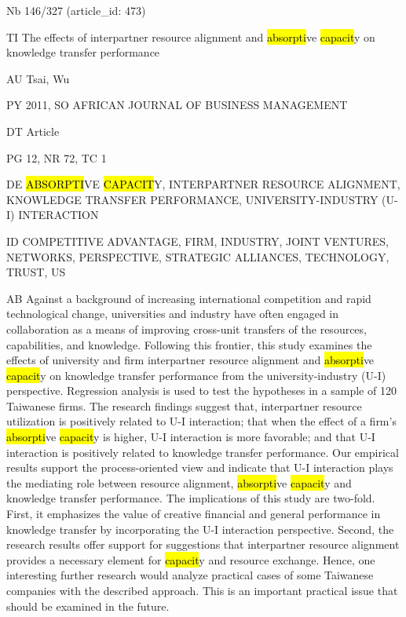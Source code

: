 \documentclass[a4paper]{article}
\begin{document}
\vspace*{-2cm}
Nb \tabto{0cm}146/327 (article\_id: 473)\par
TI \tabto{0cm}The effects of interpartner resource alignment and \hl{absorpti}ve \hl{capacit}y on knowledge transfer performance\par
AU \tabto{0cm}Tsai, Wu\par
PY \tabto{0cm}2011, SO AFRICAN JOURNAL OF BUSINESS MANAGEMENT\par
DT \tabto{0cm}Article\par
PG \tabto{0cm}12, NR 72, TC 1\par
DE \tabto{0cm}\hl{ABSORPTI}VE \hl{CAPACIT}Y, INTERPARTNER RESOURCE ALIGNMENT, KNOWLEDGE TRANSFER PERFORMANCE, UNIVERSITY-INDUSTRY (U-I) INTERACTION\par
ID \tabto{0cm}COMPETITIVE ADVANTAGE, FIRM, INDUSTRY, JOINT VENTURES, NETWORKS, PERSPECTIVE, STRATEGIC ALLIANCES, TECHNOLOGY, TRUST, US\par
AB \tabto{0cm}Against a background of increasing international competition and rapid technological change, universities and industry have often engaged in collaboration as a means of improving cross-unit transfers of the resources, capabilities, and knowledge. Following this frontier, this study examines the effects of university and firm interpartner resource alignment and \hl{absorpti}ve \hl{capacit}y on knowledge transfer performance from the university-industry (U-I) perspective. Regression analysis is used to test the hypotheses in a sample of 120 Taiwanese firms. The research findings suggest that, interpartner resource utilization is positively related to U-I interaction; that when the effect of a firm's \hl{absorpti}ve \hl{capacit}y is higher, U-I interaction is more favorable; and that U-I interaction is positively related to knowledge transfer performance. Our empirical results support the process-oriented view and indicate that U-I interaction plays the mediating role between resource alignment, \hl{absorpti}ve \hl{capacit}y and knowledge transfer performance. The implications of this study are two-fold. First, it emphasizes the value of creative financial and general performance in knowledge transfer by incorporating the U-I interaction perspective. Second, the research results offer support for suggestions that interpartner resource alignment provides a necessary element for \hl{capacit}y and resource exchange. Hence, one interesting further research would analyze practical cases of some Taiwanese companies with the described approach. This is an important practical issue that should be examined in the future.\par
\clearpage
\end{document}
